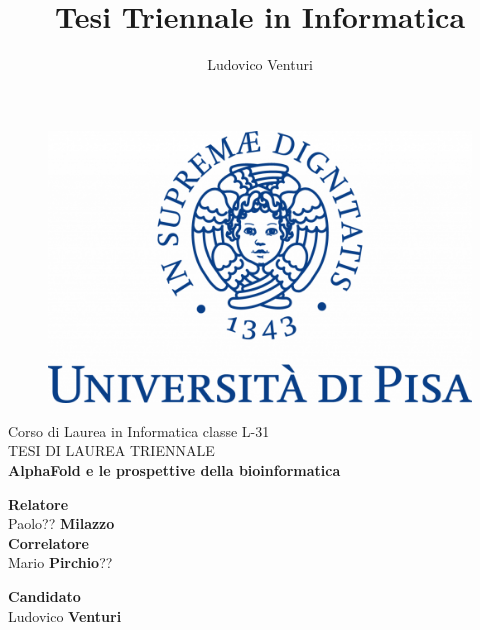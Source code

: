 \documentclass[12pt]{report}
\begin{document}
	
\author{Ludovico Venturi}
\title{Tesi Triennale in Informatica}
	
\begin{titlepage}
	\begin{figure}
		\centering\includegraphics[scale=0.2] {images/UNIPI_Logo.png}
	\end{figure}
	
	\begin{center}
		{\LARGE{ Corso di Laurea in Informatica classe L-31 \\}}
		\vspace{2cm}
		{\Large { TESI DI LAUREA TRIENNALE }}\\
		\vspace{2cm}
		{\LARGE { \textbf{AlphaFold e le prospettive della bioinformatica} }}
	\end{center}
	
	\vspace{2cm}
	
	\begin{minipage}[t]{0.6\textwidth}
		{\large{\textbf{Relatore}\\ Paolo?? \textbf{Milazzo}}}
		\vspace{0.5cm}
		{\large{\\\textbf{Correlatore}\\ Mario \textbf{Pirchio}??}}
	\end{minipage}\hfill\begin{minipage}[t]{0.47\textwidth}\raggedleft
		{\large{\textbf{Candidato} \\ Ludovico \textbf{Venturi}\\ }}
	\end{minipage}
	
	\vspace{25mm}
	
\end{titlepage}
\end{document}
